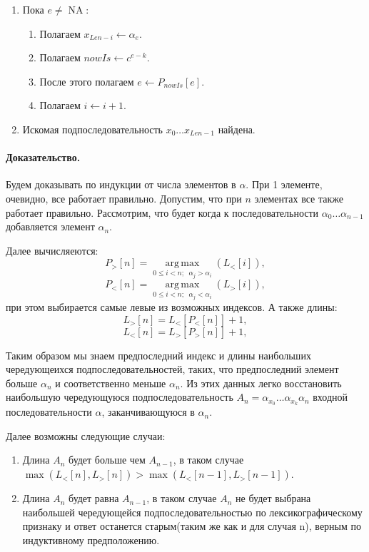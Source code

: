 \documentclass[12pt]{article}
\newcommand{\NA}{\operatorname{NA}}
\begin{document}
\begin{enumerate}
    \item Пока $ e \ne \NA $: 
    \begin{enumerate} 
        \item Полагаем $x_{Len - i} \leftarrow \alpha_e $. 

        \item Полагаем $ nowIs \leftarrow c^{e - k} $.

        \item После этого полагаем $ e \leftarrow P_{nowIs}[e] $.

        \item Полагаем $ i \leftarrow i + 1 $.
    \end{enumerate}
    
    \item Искомая подпоследовательность $ x_0 \dots x_{Len - 1} $ найдена.
    
\end{enumerate}




\paragraph{Доказательство.}
Будем доказывать по индукции от числа элементов в $ \alpha $. При 1 элементе, очевидно, все работает
правильно. Допустим, что при $ n $ элементах все также работает правильно. Рассмотрим, что будет когда
к последовательности $ \alpha_0 \dots \alpha_{n - 1} $ добавляется элемент $ \alpha_n $.

Далее вычисляеются:
$$ P_>[n] = \operatorname*{arg\,max}\limits_{ 0 \le i < n;\;\; \alpha_j > \alpha_i} (L_<[i]), $$ 
$$ P_<[n] = \operatorname*{arg\,max}\limits_{ 0 \le i < n;\;\; \alpha_j < \alpha_i} (L_>[i]), $$ 
при этом выбирается самые левые из возможных индексов. А также длины:
$$ L_>[n] = L_<[P_<[n]] + 1, $$
$$ L_<[n] = L_>[P_>[n]] + 1, $$

Таким образом мы знаем предпоследний индекс и длины наибольших чередующеихся подпоследовательностей,
таких, что предпоследний элемент больше $\alpha_n$ и соответственно меньше $\alpha_n$. Из этих данных
легко восстановить наибольшую чередующуюся подпоследовательность $ A_n = \alpha_{x_0} \dots \alpha_{x_k} \alpha_n $
входной последовательности $ \alpha $, заканчивающуюся в $ \alpha_n $.

Далее возможны следующие случаи:
\begin{enumerate}
    \item Длина $ A_n $ будет больше чем $ A_{n - 1} $, в таком случае 
    $ \max(L_<[n], L_>[n]) > \max(L_<[n-1],L_>[n-1]) $. 

    \item Длина $ A_n $ будет равна $ A_{n-1} $, в таком случае $ A_n $
    не будет выбрана наибольшей чередующейся подпоследовательностью по
    лексикографическому признаку и ответ останется старым(таким же как и
    для случая n), верным по индуктивному предположению.
\end{enumerate}
\end{document}

